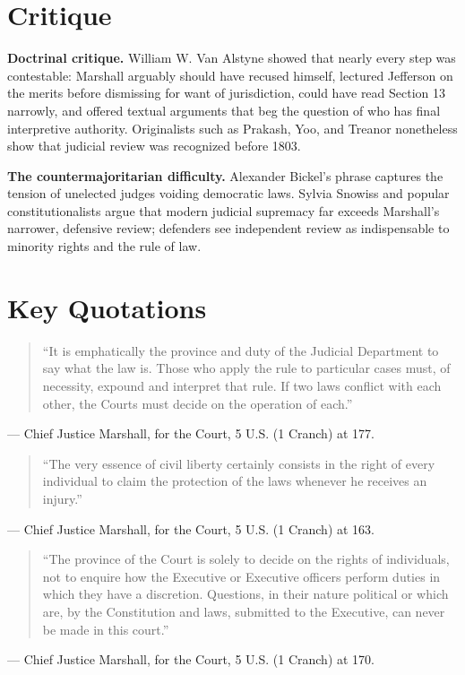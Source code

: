 \documentclass[12pt]{article}
\begin{document}
\section{Critique}

\textbf{Doctrinal critique.} William W. Van Alstyne showed that nearly every step was contestable: Marshall arguably should have recused himself, lectured Jefferson on the merits before dismissing for want of jurisdiction, could have read Section 13 narrowly, and offered textual arguments that beg the question of who has final interpretive authority. Originalists such as Prakash, Yoo, and Treanor nonetheless show that judicial review was recognized before 1803.

\textbf{The countermajoritarian difficulty.} Alexander Bickel's phrase captures the tension of unelected judges voiding democratic laws. Sylvia Snowiss and popular constitutionalists argue that modern judicial supremacy far exceeds Marshall's narrower, defensive review; defenders see independent review as indispensable to minority rights and the rule of law.

\section{Key Quotations}

\begin{quote}
``It is emphatically the province and duty of the Judicial Department to say what the law is. Those who apply the rule to particular cases must, of necessity, expound and interpret that rule. If two laws conflict with each other, the Courts must decide on the operation of each.''
\end{quote}
\noindent --- Chief Justice Marshall, for the Court, 5 U.S. (1 Cranch) at 177.

\begin{quote}
``The very essence of civil liberty certainly consists in the right of every individual to claim the protection of the laws whenever he receives an injury.''
\end{quote}
\noindent --- Chief Justice Marshall, for the Court, 5 U.S. (1 Cranch) at 163.

\begin{quote}
``The province of the Court is solely to decide on the rights of individuals, not to enquire how the Executive or Executive officers perform duties in which they have a discretion. Questions, in their nature political or which are, by the Constitution and laws, submitted to the Executive, can never be made in this court.''
\end{quote}
\noindent --- Chief Justice Marshall, for the Court, 5 U.S. (1 Cranch) at 170.
\end{document}
